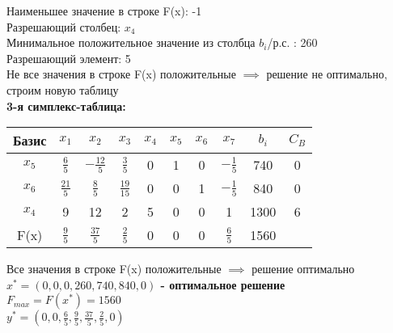 \begin{flushleft}
    Наименьшее значение в строке F(x): -1\\
    Разрешающий столбец: $x_4$\\
    Минимальное положительное значение из столбца $b_i$/р.с. : 260\\
    Разрешающий элемент: 5\\
    Не все значения в строке F(x) положительные $\implies$ решение не оптимально, строим новую таблицу\\
    {\bf3-я симплекс-таблица:}\\
\end{flushleft}

\begin{center}
    \begin{tabular}{|c | c c c c c c c c c|} 
         \hline
            Базис & $x_1$ & $x_2$ & $x_3$ & $x_4$ & $x_5$ & $x_6$ & $x_7$ & $b_i$ & $C_{B}$\\
         \hline
            $x_5$ & $\frac{6}{5}$ & $-\frac{12}{5}$ & $\frac{3}{5}$ & 0 & 1 & 0 & $-\frac{1}{5}$ & 740 & 0 \\
         \hline
            $x_6$ & $\frac{21}{5}$ & $\frac{8}{5}$ & $\frac{19}{15}$ & 0 & 0 & 1 & $-\frac{1}{5}$ & 840 & 0 \\
        \hline
            $x_4$ & 9 & 12 & 2 & 5 & 0 & 0 & 1 & 1300 & 6 \\
         \hline
            F(x) & $\frac{9}{5}$ & $\frac{37}{5}$ & $\frac{2}{5}$ & 0 & 0 & 0 & $\frac{6}{5}$ & 1560 & \\
         \hline
    \end{tabular}
\end{center}

\begin{flushleft}
    Все значения в строке F(x) положительные $\implies$ решение оптимально\\
    {\bf$x^{*} = (0, 0, 0, 260, 740, 840, 0)$ - оптимальное решение\\
    $F_{max} = F(x^{*}) = 1560$\\
    $y^{*} = (0, 0, \frac{6}{5}, \frac{9}{5}, \frac{37}{5}, \frac{2}{5}, 0)$}\\
\end{flushleft}

